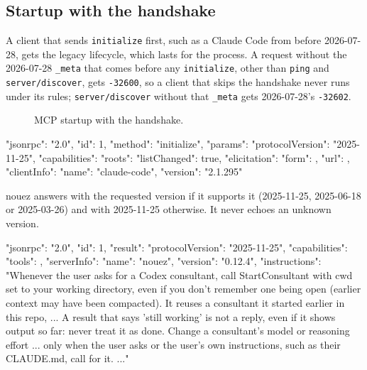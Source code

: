 \documentclass[10pt,a4paper]{article}
\newcommand{\lifelines}[2]{%
  \foreach \x/\name/\col in {#1} {%
    \node[actor, draw=\col, text=\col] at (\x,0) {\name};
    \draw[lifeline] (\x,-0.4) -- (\x,-#2);
  }}
\newcommand{\msg}[4]{\draw[call] (#2,-#1) -- node[above=1pt,lbl]{#4} (#3,-#1);}
\newcommand{\ret}[4]{\draw[reply] (#2,-#1) -- node[above=1pt,lbl]{#4} (#3,-#1);}
\newcommand{\side}[3]{\node[note, anchor=west] at (#2+0.15,-#1) {#3};}
\newcommand{\code}[1]{\texttt{#1}}
\begin{document}
\subsection{Startup with the handshake}

A client that sends \code{initialize} first, such as a Claude Code from before 2026-07-28, gets the
legacy lifecycle, which lasts for the process. A request without the 2026-07-28 \code{\_meta} that
comes before any \code{initialize}, other than \code{ping} and \code{server/discover}, gets
\code{-32600}, so a client that skips the handshake never runs under its rules; \code{server/discover}
without that \code{\_meta} gets 2026-07-28's \code{-32602}.

\begin{figure}[H]
\centering
{}
\caption{MCP startup with the handshake.}
\end{figure}

\begin{wire}
{"jsonrpc": "2.0", "id": 1, "method": "initialize", "params": {
  "protocolVersion": "2025-11-25",
  "capabilities": {"roots": {"listChanged": true}, "elicitation": {"form": {}, "url": {}}},
  "clientInfo": {"name": "claude-code", "version": "2.1.295"}}}
\end{wire}

nouez answers with the requested version if it supports it (2025-11-25, 2025-06-18 or
2025-03-26) and with 2025-11-25 otherwise. It never echoes an unknown version.

\begin{wire}
{"jsonrpc": "2.0", "id": 1, "result": {
  "protocolVersion": "2025-11-25",
  "capabilities": {"tools": {}},
  "serverInfo": {"name": "nouez", "version": "0.12.4"},
  "instructions": "Whenever the user asks for a Codex consultant, call StartConsultant with cwd set to your working directory, even if you don't remember one being open (earlier context may have been compacted). It reuses a consultant it started earlier in this repo, ... A result that says 'still working' is not a reply, even if it shows output so far: never treat it as done. Change a consultant's model or reasoning effort ... only when the user asks or the user's own instructions, such as their CLAUDE.md, call for it. ..."}}
\end{wire}
\end{document}
